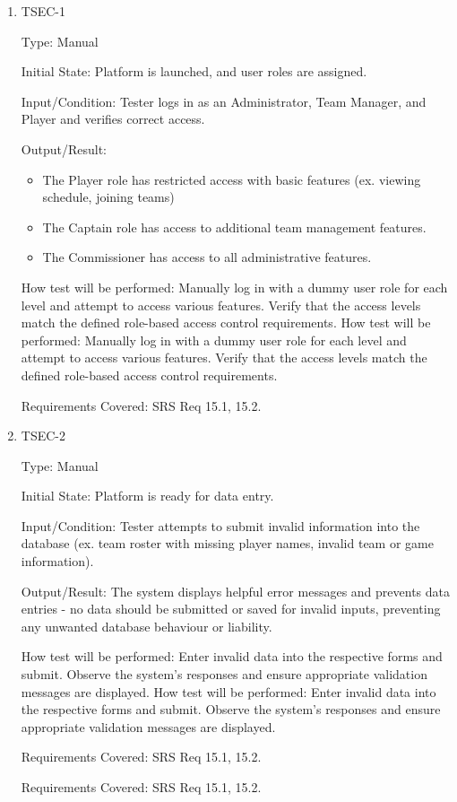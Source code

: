 \documentclass[12pt, titlepage]{article}
\begin{document}
\begin{enumerate}

  \item{TSEC-1\\}

        Type: Manual

        Initial State: Platform is launched, and user roles are assigned.

        Input/Condition: Tester logs in as an Administrator, Team Manager, and Player and verifies correct access.

        Output/Result:

        \begin{itemize}
          \item{The Player role has restricted access with basic features (ex. viewing schedule, joining teams)}
          \item{The Captain role has access to additional team management features.}
          \item{The Commissioner has access to all administrative features.}

        \end{itemize}

        How test will be performed: Manually log in with a dummy user role for each level and attempt to access various features. Verify that the access levels match the defined role-based access control requirements.
How test will be performed: Manually log in with a dummy user role for each level and attempt to access various features. Verify that the access levels match the defined role-based access control requirements.

Requirements Covered: SRS Req 15.1, 15.2.

\item{TSEC-2\\}

        Type: Manual

        Initial State: Platform is ready for data entry.

        Input/Condition: Tester attempts to submit invalid information into the database (ex. team roster with missing player names, invalid team or game information).

        Output/Result: The system displays helpful error messages and prevents data entries - no data should be submitted or saved for invalid inputs, preventing any unwanted database behaviour or liability.

        How test will be performed: Enter invalid data into the respective forms and submit. Observe the system's responses and ensure appropriate validation messages are displayed.
How test will be performed: Enter invalid data into the respective forms and submit. Observe the system's responses and ensure appropriate validation messages are displayed.

Requirements Covered: SRS Req 15.1, 15.2.

        Requirements Covered: SRS Req 15.1, 15.2.

\end{enumerate}
\end{document}
